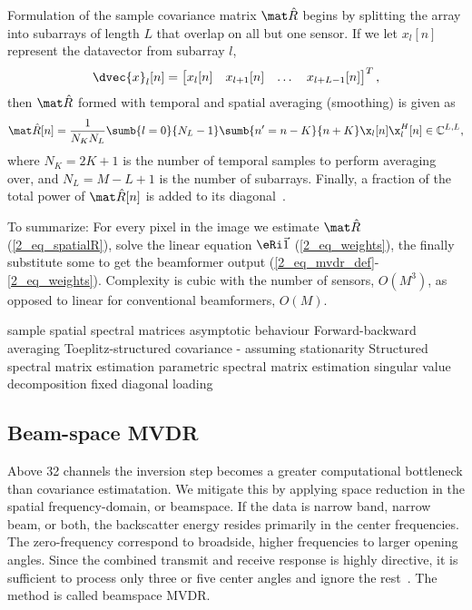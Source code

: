 {Formulation of the sample covariance matrix $\eR$ begins by splitting the array into subarrays of length $L$ that overlap on all but one sensor. If we let $x_l[n]$ represent the datavector from subarray $l$,
%
\begin{gather}
\dvec{x}_l[n] = \bmat{x_l[n] & x_{l+1}[n] & \dots & x_{l+L-1}[n]}^T,
\end{gather}
%
then $\eR$ formed with temporal and spatial averaging (smoothing) is given as
%
\begin{gather}
\eR[n] =  \frac{1}{N_K N_L} \sumb{l=0}{N_L-1}\sumb{n'=n-K}{n+K} \x_l[n]\x_l^H[n] \in\mathbb{C}^{L,L},\label{2_eq_spatialR}
\end{gather}
%
where $N_K = 2K+1$ is the number of temporal samples to perform averaging over, and $N_L = M-L+1$ is the number of subarrays. Finally, a fraction of the total power of $\eR[n]$ is added to its diagonal~\cite{Synnevag2007}.

To summarize: For every pixel in the image we estimate $\eR$ (\ref{2_eq_spatialR}), solve the linear equation $\eRi\1$ (\ref{2_eq_weights}), the finally substitute some to get the beamformer output (\ref{2_eq_mvdr_def}-\ref{2_eq_weights}). Complexity is cubic with the number of sensors, $O(M^3)$, as opposed to linear for conventional beamformers, $O(M)$.


sample spatial spectral matrices
asymptotic behaviour
Forward-backward averaging
Toeplitz-structured covariance - assuming stationarity
Structured spectral matrix estimation
parametric spectral matrix estimation
singular value decomposition
fixed diagonal loading



\subsection{Beam-space MVDR}

Above 32 channels the inversion step becomes a greater computational bottleneck than covariance estimatation. We mitigate this by applying space reduction in the spatial frequency-domain, or beamspace. If the data is narrow band, narrow beam, or both, the backscatter energy resides primarily in the center frequencies. The zero-frequency correspond to broadside, higher frequencies to larger opening angles. Since the combined transmit and receive response is highly directive, it is sufficient to process only three or five center angles and ignore the rest~\cite{Nilsen2009a,VanTrees2002}. The method is called beamspace MVDR.

}
